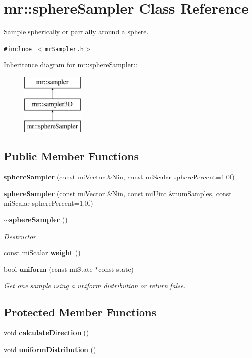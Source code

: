 \section{mr::sphere\-Sampler Class Reference}
\label{classmr_1_1sphereSampler}
Sample spherically or partially around a sphere.  


{\tt \#include $<$mr\-Sampler.h$>$}

Inheritance diagram for mr::sphere\-Sampler::\begin{figure}[H]
\begin{center}
\leavevmode
\includegraphics[height=3cm]{classmr_1_1sphereSampler}
\end{center}
\end{figure}
\subsection*{Public Member Functions}
\begin{CompactItemize}
\item 
{\bf sphere\-Sampler} (const mi\-Vector \&Nin, const mi\-Scalar sphere\-Percent=1.0f)
\item 
{\bf sphere\-Sampler} (const mi\-Vector \&Nin, const mi\-Uint \&num\-Samples, const mi\-Scalar sphere\-Percent=1.0f)
\item 
{\bf $\sim$sphere\-Sampler} ()
\begin{CompactList}\small\item\em Destructor. \item\end{CompactList}\item 
const mi\-Scalar {\bf weight} ()
\item 
bool {\bf uniform} (const mi\-State $\ast$const state)
\begin{CompactList}\small\item\em Get one sample using a uniform distribution or return false. \item\end{CompactList}\end{CompactItemize}
\subsection*{Protected Member Functions}
\begin{CompactItemize}
\item 
void {\bf calculate\-Direction} ()
\item 
void {\bf uniform\-Distribution} ()
\end{CompactItemize}


